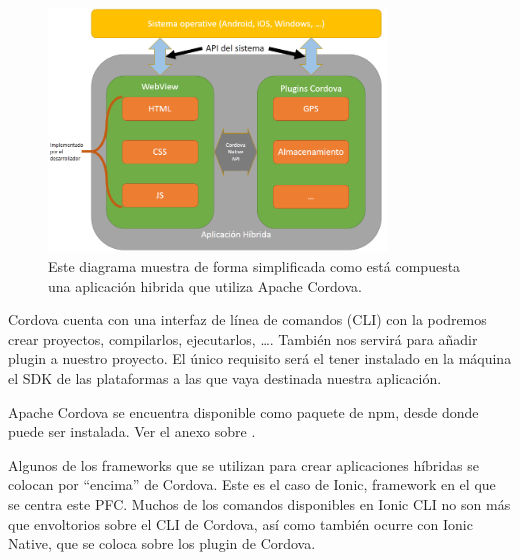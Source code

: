 \begin{figure}[H]
\centering
  \includegraphics[width=0.8\textwidth]{Figures/ch1/cordova/diagram}
  \caption{Este diagrama muestra de forma simplificada como está compuesta una aplicación hibrida que utiliza Apache Cordova.}
\end{figure}

Cordova cuenta con una interfaz de línea de comandos (\gls{CLI}) con la podremos crear proyectos, compilarlos, ejecutarlos, \ldots. También nos servirá para añadir plugin a nuestro proyecto. El único requisito será el tener instalado en la máquina el SDK de las plataformas a las que vaya destinada nuestra aplicación.

Apache Cordova se encuentra disponible como paquete de \gls{npm}, desde donde puede ser instalada. Ver el anexo sobre .

Algunos de los frameworks que se utilizan para crear aplicaciones híbridas se colocan por ``encima'' de Cordova. Este es el caso de Ionic, framework en el que se centra este \gls{PFC}. Muchos de los comandos disponibles en Ionic \gls{CLI} no son más que envoltorios sobre el \gls{CLI} de Cordova, así como también ocurre con Ionic Native, que se coloca sobre los plugin de Cordova.
